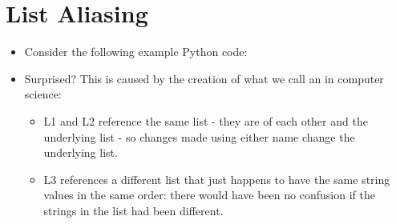 \documentclass[letterpaper,10pt,english]{sphinxmanual}
\begin{document}
\section{List Aliasing}
\label{\detokenize{lecture_notes/lec10_lists2:list-aliasing}}\begin{itemize}
\item {} 
Consider the following example Python code:

\begin{sphinxVerbatim}[commandchars=\\\{\}]
  \PYG{p}{[}  \PYG{p}{]}
  
  \PYG{p}{[}  \PYG{p}{]}
\PYG{p}{[}\PYG{p}{]}  
\end{sphinxVerbatim}

\item {} 
Surprised? This is caused by the creation of what we call an
 in computer science:
\begin{itemize}
\item {} 
L1 and L2 reference the same list - they are  of each
other and the underlying list - so changes made using either
name change the underlying list.

\item {} 
L3 references a different list that just happens to have the
same string values in the same order: there would have been no
confusion if the strings in the list had been different.


\end{itemize}
\end{itemize}
\end{document}
